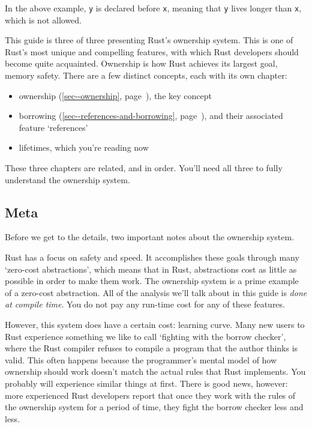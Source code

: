 \documentclass[a4paper,]{book}
\renewcommand*{\hyperref}[2][\ar]{%
  \def\ar{#2}%
  #2 (\autoref{#1}, page~\pageref{#1})}
\begin{document}
In the above example, \texttt{y} is declared before \texttt{x}, meaning
that \texttt{y} lives longer than \texttt{x}, which is not allowed.


This guide is three of three presenting Rust's ownership system. This is
one of Rust's most unique and compelling features, with which Rust
developers should become quite acquainted. Ownership is how Rust
achieves its largest goal, memory safety. There are a few distinct
concepts, each with its own chapter:

\begin{itemize}
\itemsep1pt\parskip0pt
\item
  \hyperref[sec--ownership]{ownership}, the key concept
\item
  \hyperref[sec--references-and-borrowing]{borrowing}, and their
  associated feature `references'
\item
  lifetimes, which you're reading now
\end{itemize}

These three chapters are related, and in order. You'll need all three to
fully understand the ownership system.

\subsection{Meta}\label{meta-2}

Before we get to the details, two important notes about the ownership
system.

Rust has a focus on safety and speed. It accomplishes these goals
through many `zero-cost abstractions', which means that in Rust,
abstractions cost as little as possible in order to make them work. The
ownership system is a prime example of a zero-cost abstraction. All of
the analysis we'll talk about in this guide is \emph{done at compile
time}. You do not pay any run-time cost for any of these features.

However, this system does have a certain cost: learning curve. Many new
users to Rust experience something we like to call `fighting with the
borrow checker', where the Rust compiler refuses to compile a program
that the author thinks is valid. This often happens because the
programmer's mental model of how ownership should work doesn't match the
actual rules that Rust implements. You probably will experience similar
things at first. There is good news, however: more experienced Rust
developers report that once they work with the rules of the ownership
system for a period of time, they fight the borrow checker less and
less.
\end{document}
